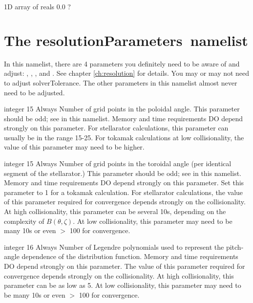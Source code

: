 \myhrule

{1D array of reals}
{0.0}
{ ?}
{}








\section{The {\ttfamily resolutionParameters}~namelist}
\label{sec:resolutionParameters}

In this namelist, there are 4 parameters you definitely need to be aware of and adjust: \Ntheta, \Nzeta, \Nxi, and \Nx.  
See chapter \ref{ch:resolution} for details. You may or may not
need to adjust {\ttfamily solverTolerance}.  The other parameters in this namelist almost never need to be adjusted.

\myhrule

{integer}
{15}
{Always}
{Number of grid points in the poloidal angle. 
This parameter should be odd; see  in this namelist.
Memory and time requirements DO depend strongly on this parameter.
For stellarator calculations, this parameter can usually be in the range 15-25.
For tokamak calculations at low collisionality, the value of this parameter may need to be higher.}


\myhrule

{integer}
{15}
{Always}
{Number of grid points in the toroidal angle (per identical segment of the stellarator.)  
This parameter should be odd; see  in this namelist.
Memory and time requirements DO depend strongly on this parameter.
Set this parameter to 1 for a tokamak calculation.
For stellarator calculations, the value of this parameter required for convergence depends strongly on
the collisionality. At high collisionality, this parameter can be several 10s, depending
on the complexity of $B(\theta,\zeta)$. At low collisionality, this parameter may need to be many 10s or
even $>$ 100 for convergence.
}

\myhrule

{integer}
{16}
{Always}
{Number of Legendre polynomials used to represent the pitch-angle dependence of the distribution function.
Memory and time requirements DO depend strongly on this parameter.
The value of this parameter required for convergence depends strongly on
the collisionality. At high collisionality, this parameter can be as low
as 5. At low collisionality, this parameter may need to be many 10s or
even $>$ 100 for convergence.}

